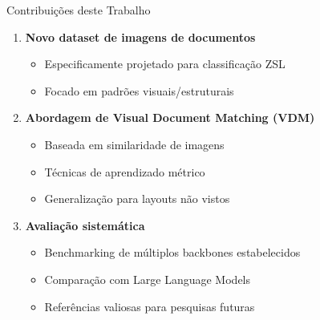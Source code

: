 \begin{frame}{Contribuições deste Trabalho}
\begin{enumerate}
    \item \textbf{Novo dataset de imagens de documentos}
    \begin{itemize}
        \item Especificamente projetado para classificação ZSL
        \item Focado em padrões visuais/estruturais
    \end{itemize}
    
    \item \textbf{Abordagem de Visual Document Matching (VDM)}
    \begin{itemize}
        \item Baseada em similaridade de imagens
        \item Técnicas de aprendizado métrico
        \item Generalização para layouts não vistos
    \end{itemize}
    
    \item \textbf{Avaliação sistemática}
    \begin{itemize}
        \item Benchmarking de múltiplos backbones estabelecidos
        \item Comparação com Large Language Models
        \item Referências valiosas para pesquisas futuras
    \end{itemize}
\end{enumerate}
\end{frame}
